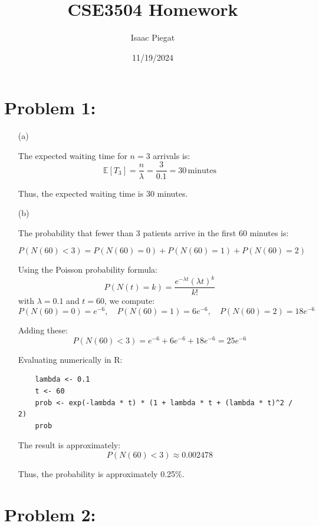 \documentclass{article}
\title{CSE3504 Homework}
\author{Isaac Piegat}
\date{11/19/2024}
\begin{document}
\maketitle

\section*{Problem 1:}
\begin{enumerate}
    \item[(a)] 

    The expected waiting time for $n = 3$ arrivals is:
    \[
    \mathbb{E}[T_3] = \frac{n}{\lambda} = \frac{3}{0.1} = 30 \, \text{minutes}
    \]

    Thus, the expected waiting time is 30 minutes. \newline
    
    \item[(b)] 

    The probability that fewer than 3 patients arrive in the first 60 minutes is:
    
    \[
    P(N(60) < 3) = P(N(60) = 0) + P(N(60) = 1) + P(N(60) = 2)
    \]
    
    Using the Poisson probability formula:
    \[
    P(N(t) = k) = \frac{e^{-\lambda t} (\lambda t)^k}{k!}
    \]
    with $\lambda = 0.1$ and $t = 60$, we compute:
    \[
    P(N(60) = 0) = e^{-6}, \quad P(N(60) = 1) = 6e^{-6}, \quad P(N(60) = 2) = 18e^{-6}
    \]
    
    Adding these:
    \[
    P(N(60) < 3) = e^{-6} + 6e^{-6} + 18e^{-6} = 25e^{-6}
    \]
    
    Evaluating numerically in R:
    \begin{verbatim}
    lambda <- 0.1
    t <- 60
    prob <- exp(-lambda * t) * (1 + lambda * t + (lambda * t)^2 / 2)
    prob
    \end{verbatim}
    
    The result is approximately:
    \[
    P(N(60) < 3) \approx 0.002478
    \]
    
    Thus, the probability is approximately 0.25\%.
\end{enumerate}

\section*{Problem 2:}
\end{document}
